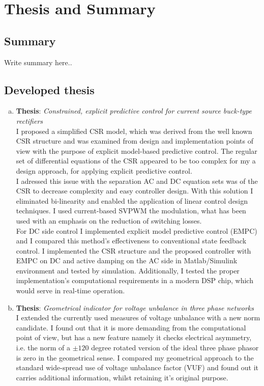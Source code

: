 \chapter{Thesis and Summary}

\section{Summary}

Write summary here..

\section{Developed thesis}

\begin{enumerate}[a.)]
\item\textbf{Thesis}: \emph{Constrained, explicit predictive control for current source buck-type rectifiers}\\
    I proposed a simplified CSR model, which was derived from the well known CSR structure and was examined from design and implementation points of view with the purpose of explicit model-based predictive control. The regular set of differential equations of the CSR appeared to be too complex for my a design approach, for applying explicit predictive control. \\
		I adressed this issue with the separation AC and DC equation sets was of the CSR to decrease complexity and easy controller design. With this solution I eliminated bi-linearity and enabled the application of linear control design techniques. I used current-based SVPWM the modulation, what has been used with an emphasis on the reduction of switching losses. \\
		For DC side control I implemented explicit model predictive control (EMPC) and I compared this method's effectiveness to conventional state feedback control. I implemented the CSR structure and the proposed controller with EMPC on DC and active damping on the AC side in Matlab/Simulink environment and tested by simulation. Additionally, I tested the proper implementation's computational requirements in a modern DSP chip, which would serve in real-time operation.\\
		
\item\textbf{Thesis}: \emph{Geometrical indicator for voltage unbalance in three phase networks}\\
    I extended the currently used measures of voltage unbalance with a new norm candidate. I found out that it is more demanding from the computational point of view, but has a new feature namely it checks electrical asymmetry, i.e. the norm of a $\pm120$ degree rotated version of the ideal three phase phasor is zero in the geometrical sense. I compared my geometrical approach to the standard wide-spread use of voltage unbalance factor (VUF) and found out it carries additional information, whilst retaining it's original purpose.\\
		

\end{enumerate}
